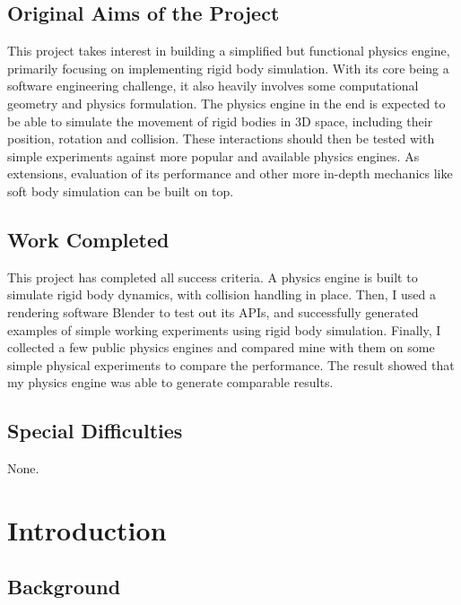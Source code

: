 \documentclass[12pt,a4paper,twoside,openright]{report}
\begin{document}
\section*{Original Aims of the Project}

This project takes interest in building a simplified but functional physics engine, primarily focusing on implementing rigid body simulation. With its core being a software engineering challenge, it also heavily involves some computational geometry and physics formulation. The physics engine in the end is expected to be able to simulate the movement of rigid bodies in 3D space, including their position, rotation and collision. These interactions should then be tested with simple experiments against more popular and available physics engines. As extensions, evaluation of its performance and other more in-depth mechanics like soft body simulation can be built on top.

\section*{Work Completed}

This project has completed all success criteria. A physics engine is built to simulate rigid body dynamics, with collision handling in place. Then, I used a rendering software Blender to test out its APIs, and successfully generated examples of simple working experiments using rigid body simulation. Finally, I collected a few public physics engines and compared mine with them on some simple physical experiments to compare the performance. The result showed that my physics engine was able to generate comparable results.

\section*{Special Difficulties}

None.

\newpage

\tableofcontents
\newpage

\pagestyle{headings}

\chapter{Introduction}

\section{Background}
\end{document}
